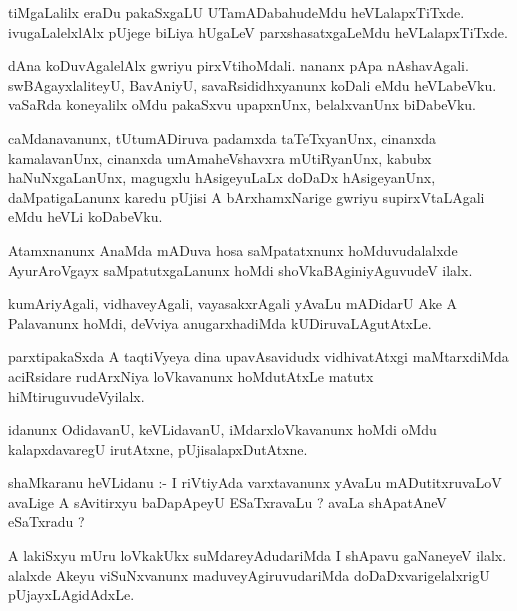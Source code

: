 \documentclass{article}
\begin{document}
\begin{mn}
tiMgaLalilx  eraDu  pakaSxgaLU  UTamADabahudeMdu  heVLalapxTiTxde.  ivugaLalelxlAlx  pUjege  
biLiya  hUgaLeV  parxshasatxgaLeMdu  heVLalapxTiTxde.
\end{mn}

\begin{mn}
dAna  koDuvAgalelAlx  gwriyu  pirxVtihoMdali.  nananx pApa  nAshavAgali.  swBAgayxlaliteyU,  
BavAniyU,  savaRsididhxyanunx  koDali  eMdu  heVLabeVku.  vaSaRda  koneyalilx  oMdu  pakaSxvu  
upapxnUnx,  belalxvanUnx  biDabeVku.
\end{mn}

\begin{mn}
caMdanavanunx,  tUtumADiruva  padamxda  taTeTxyanUnx,  cinanxda  kamalavanUnx,  cinanxda  
umAmaheVshavxra  mUtiRyanUnx,  kabubx  haNuNxgaLanUnx,  magugxlu  hAsigeyuLaLx  doDaDx  
hAsigeyanUnx,  daMpatigaLanunx  karedu  pUjisi  A  bArxhamxNarige  gwriyu  supirxVtaLAgali  
eMdu  heVLi  koDabeVku.
\end{mn}

\begin{mn}
Atamxnanunx  AnaMda  mADuva  hosa  saMpatatxnunx  hoMduvudalalxde  AyurAroVgayx  
saMpatutxgaLanunx  hoMdi  shoVkaBAginiyAguvudeV ilalx.
\end{mn}

\begin{mn}
kumAriyAgali,  vidhaveyAgali,  vayasakxrAgali  yAvaLu  mADidarU  Ake  A  Palavanunx  
hoMdi,  deVviya  anugarxhadiMda  kUDiruvaLAgutAtxLe.
\end{mn}

\begin{mn}
parxtipakaSxda  A  taqtiVyeya  dina  upavAsavidudx  vidhivatAtxgi  maMtarxdiMda  aciRsidare  
rudArxNiya  loVkavanunx  hoMdutAtxLe  matutx  hiMtiruguvudeVyilalx.
\end{mn}

\begin{mn}
idanunx  OdidavanU,  keVLidavanU,  iMdarxloVkavanunx  hoMdi  oMdu  kalapxdavaregU  
irutAtxne,  pUjisalapxDutAtxne.
\end{mn}

\begin{mn}
shaMkaranu  heVLidanu :- I riVtiyAda  varxtavanunx  yAvaLu  mADutitxruvaLoV  avaLige  
A  sAvitirxyu  baDapApeyU  ESaTxravaLu ?  avaLa  shApatAneV  eSaTxradu ?
\end{mn}

\begin{mn}
A  lakiSxyu  mUru  loVkakUkx  suMdareyAdudariMda  I  shApavu  gaNaneyeV  ilalx.  alalxde  
Akeyu  viSuNxvanunx  maduveyAgiruvudariMda  doDaDxvarigelalxrigU  pUjayxLAgidAdxLe.
\end{mn}
\end{document}
